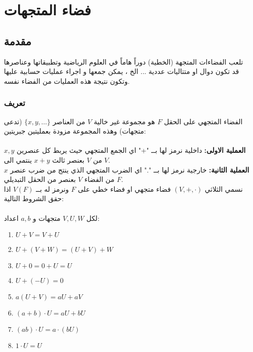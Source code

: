 \chapter{فضاء المتجهات}

\section{مقدمة}
تلعب الفضاءات المتجهة (الخطية) دوراً هاماً في العلوم الرياضية وتطبيقاتها وعناصرها قد تكون دوال او متتاليات عددية ... الخ ، يمكن جمعها و اجراء عمليات حسابية عليها وتكون نتيجة هذه العمليات من الفضاء نفسه.

\subsection*{تعريف}
الفضاء المتجهي على الحقل $F$ هو مجموعة غير خالية $V$ من العناصر $\{x, y, \dots\}$ (تدعى متجهات) وهذه المجموعة مزودة بعمليتين جبريتين:\\ \\
\noindent
\textbf{العملية الاولى:} داخلية نرمز لها بــ "+" اي الجمع المتجهي حيث يربط كل عنصرين $x, y$ من $V$ بعنصر ثالث $x+y$ ينتمي الى $V$.\\
\noindent
\textbf{العملية الثانية:} خارجية نرمز لها بــ "." اي الضرب المتجهي الذي ينتج من ضرب عنصر $x$ من الفضاء $V$ بعنصر من الحقل التبديلي $F$.\\
\noindent
نسمي الثلاثي $(V, +, \cdot)$ فضاء متجهي او فضاء خطي على $F$ ونرمز له بــ $V(F)$ اذا حقق الشروط التالية:\\ \\
\noindent
لكل $V, U, W$ متجهات و $a, b$ اعداد:
\begin{english}
	\begin{enumerate}
	\item $U+V = V+U$
	\item $U+(V+W) = (U+V)+W$
	\item $U+0=0+U=U$
	\item $U+(-U) = 0$
	\item $a(U+V) = aU + aV$
	\item $(a+b)\cdot U = aU + bU$
	\item $(ab)\cdot U = a\cdot (bU)$
	\item $1\cdot U = U$
\end{enumerate}
\end{english}
\newpage
